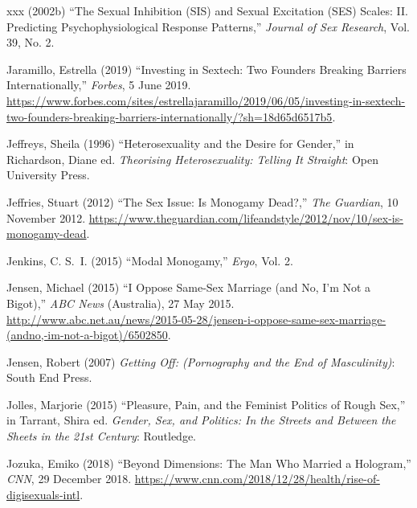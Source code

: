 \documentclass[]{jlreq} \usepackage{mystyle}
\begin{document}
\begin{thebibliography}{xxx}
 \bysame{}  (2002b) ``The Sexual Inhibition (SIS) and Sexual Excitation (SES)
  Scales: II. Predicting Psychophysiological Response Patterns,'' \textit{
  Journal of Sex Research}, Vol. 39, No. 2.

Jaramillo, Estrella (2019) ``Investing in Sextech: Two Founders Breaking
  Barriers Internationally,'' \emph{Forbes}, 5 June 2019.
  \url{https://www.forbes.com/sites/estrellajaramillo/2019/06/05/investing-in-sextech-two-founders-breaking-barriers-internationally/?sh=18d65d6517b5}.

Jeffreys, Sheila (1996) ``Heterosexuality and the Desire for Gender,'' in
  Richardson, Diane ed.   \textit{ Theorising Heterosexuality: Telling It
  Straight}: Open University Press.

Jeffries, Stuart (2012) ``The Sex Issue: Is Monogamy Dead?,'' \emph{The
  Guardian}, 10 November 2012.
  \url{https://www.theguardian.com/lifeandstyle/2012/nov/10/sex-is-monogamy-dead}.

Jenkins, C. S.~I. (2015) ``Modal Monogamy,'' \textit{ Ergo}, Vol. 2.

Jensen, Michael (2015) ``I Oppose Same-Sex Marriage (and No, I'm Not a
  Bigot),'' \emph{ABC News} (Australia), 27 May 2015.
  \url{http://www.abc.net.au/news/2015-05-28/jensen-i-oppose-same-sex-marriage-(andno,-im-not-a-bigot)/6502850}.

Jensen, Robert (2007)  \textit{ Getting Off: (Pornography and the End of
  Masculinity)}: South End Press.

Jolles, Marjorie (2015) ``Pleasure, Pain, and the Feminist Politics of Rough
  Sex,'' in Tarrant, Shira ed.   \textit{ Gender, Sex, and Politics: In the
  Streets and Between the Sheets in the 21st Century}: Routledge.

Jozuka, Emiko (2018) ``Beyond Dimensions: The Man Who Married a Hologram,''
  \emph{CNN}, 29 December 2018.
  \url{https://www.cnn.com/2018/12/28/health/rise-of-digisexuals-intl}.


\end{thebibliography}
\end{document}
